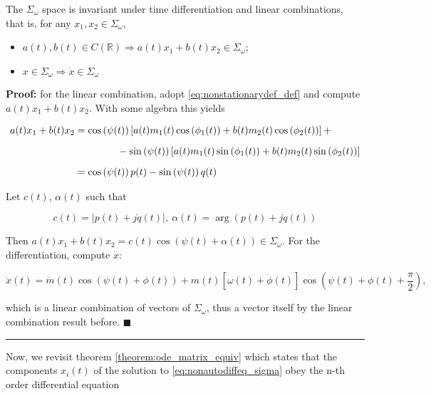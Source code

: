 \begin{theorem}\label{theo:sigma_invariancy}%
The $\Sigma_\omega$ space is invariant under time differentiation and linear combinations, that is, for any $x_1,x_2\in\Sigma_\omega$,

\begin{itemize} \item $a(t),b(t)\in C\left(\mathbb{R}\right) \Rightarrow a(t)x_1 + b(t)x_2\in\Sigma_\omega$; \item $x\in\Sigma_\omega \Rightarrow\dot{x} \in \Sigma_\omega$\end{itemize}
\end{theorem}
\textbf{Proof:} for the linear combination, adopt \eqref{eq:nonstationarydef_def} and compute $a(t)x_1 + b(t)x_2$. With some algebra this yields

\begin{align}
	a(t)x_1 + b(t)x_2 &= \cos\left(\psi(t)\right)\left[a(t)m_1(t)\cos\left(\phi_1(t)\right) + b(t)m_2(t)\cos\left(\phi_2(t)\right)\right] + \nonumber\\[2mm] &\hspace{15mm} - \sin\left(\psi(t)\right)\left[a(t)m_1(t)\sin\left(\phi_1(t)\right) + b(t)m_2(t)\sin\left(\phi_2(t)\right)\right] \nonumber\\[2mm]
	&= \cos\left(\psi(t)\right)p(t) - \sin\left(\psi(t)\right)q(t)
\end{align}
	
	Let $c(t)$, $\alpha(t)$ such that

\begin{equation} c(t) = \left\lvert p(t) + jq(t)\right\rvert,\ \alpha(t) = \arg\left(p(t) + jq(t)\right) \end{equation}

	Then $a(t)x_1 + b(t)x_2 = c(t)\cos\left(\psi(t) + \alpha(t)\right)\in\Sigma_\omega$. For the differentiation, compute $\dot{x}$:

\begin{equation} \dot{x}(t) = \dot{m}(t)\cos\left(\psi(t) + \phi(t)\right) + m(t)\left[\omega(t) + \dot{\phi}(t)\right]\cos\left(\psi(t) + \phi(t) + \dfrac{\pi}{2} \right), \end{equation}

	\noindent which is a linear combination of vectors of $\Sigma_\omega$, thus a vector itself by the linear combination result before. \hfill$\blacksquare$
\vspace{5mm}
\hrule
\vspace{5mm}

	Now, we revisit theorem \ref{theorem:ode_matrix_equiv} which states that the components $x_i(t)$ of the solution to \eqref{eq:nonautodiffeq_sigma} obey the n-th order differential equation

